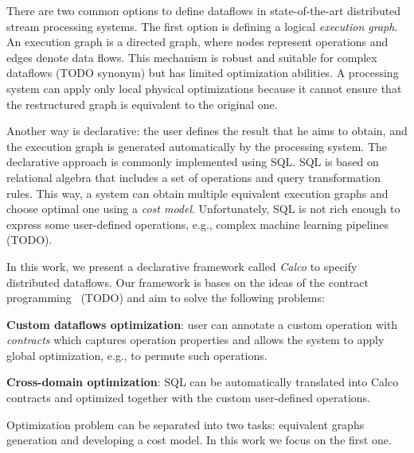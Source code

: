 There are two common options to define dataflows in state-of-the-art distributed stream processing systems.
The first option is defining a logical {\em execution graph}.
An execution graph is a directed graph, where nodes represent operations and edges denote data flows.
This mechanism is robust and suitable for complex dataflows (TODO synonym) but has limited optimization abilities.
A processing system can apply only local physical optimizations because it cannot ensure that the restructured graph is equivalent to the original one.

Another way is declarative: the user defines the result that he aims to obtain, and the execution graph is generated automatically by the processing system.
The declarative approach is commonly implemented using SQL.
SQL is based on relational algebra that includes a set of operations and query transformation rules.
This way, a system can obtain multiple equivalent execution graphs and choose optimal one using a {\em cost model}.
Unfortunately, SQL is not rich enough to express some user-defined operations, e.g., complex machine learning pipelines~\cite{PROOF} (TODO).

In this work, we present a declarative framework called {\em Calco} to specify distributed dataflows.
Our framework is bases on the ideas of the contract programming~\cite{REF} (TODO) and aim to solve the following problems:

{\bf Custom dataflows optimization}: user can annotate a custom operation with {\em contracts} which captures operation properties and allows the system to apply global optimization, e.g., to permute such operations.

{\bf Cross-domain optimization}: SQL can be automatically translated into Calco contracts and optimized together with the custom user-defined operations.

Optimization problem can be separated into two tasks: equivalent graphs generation and developing a cost model.
In this work we focus on the first one.
